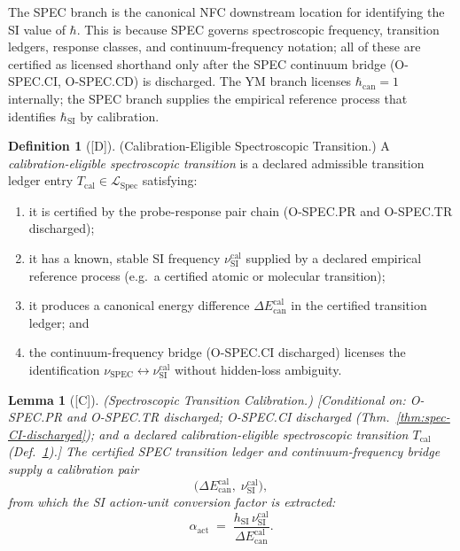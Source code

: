 \documentclass[12pt,oneside]{amsbook}
\theoremstyle{plain}
\newtheorem{lemma}[theorem]{Lemma}
\theoremstyle{definition}
\newtheorem{definition}[theorem]{Definition}
\theoremstyle{remark}
\newcommand{\status}[1]{\textup{[#1]}}
\begin{document}
The SPEC branch is the canonical NFC downstream location for
identifying the SI value of $\hbar$. This is because SPEC governs
spectroscopic frequency, transition ledgers, response classes, and
continuum-frequency notation; all of these are certified as licensed
shorthand only after the SPEC continuum bridge (O-SPEC.CI, O-SPEC.CD)
is discharged. The YM branch licenses $\hbar_{\mathrm{can}}=1$
internally; the SPEC branch supplies the empirical reference process
that identifies $\hbar_{\mathrm{SI}}$ by calibration.

\begin{definition}[\status{D}]\label{def:spec-calibration-transition}
\textup{(Calibration-Eligible Spectroscopic Transition.)}
A \emph{calibration-eligible spectroscopic transition} is a declared
admissible transition ledger entry
$T_{\mathrm{cal}} \in \mathcal{L}_{\mathrm{Spec}}$
satisfying:
\begin{enumerate}[label=\textup{(\arabic*)}]
 \item it is certified by the probe-response pair chain
 (O-SPEC.PR and O-SPEC.TR discharged);
 \item it has a known, stable SI frequency
 $\nu_{\mathrm{SI}}^{\mathrm{cal}}$
 supplied by a declared empirical reference process (e.g.\ a
 certified atomic or molecular transition);
 \item it produces a canonical energy difference
 $\Delta E_{\mathrm{can}}^{\mathrm{cal}}$
 in the certified transition ledger; and
 \item the continuum-frequency bridge (O-SPEC.CI discharged) licenses
 the identification
 $\nu_{\mathrm{SPEC}} \leftrightarrow \nu_{\mathrm{SI}}^{\mathrm{cal}}$
 without hidden-loss ambiguity.
\end{enumerate}
\end{definition}

\begin{lemma}[\status{C}]\label{lem:SPEC-transition-calibration}
\textup{(Spectroscopic Transition Calibration.)}
\textup{[Conditional on: O-SPEC.PR and O-SPEC.TR discharged;
O-SPEC.CI discharged (Thm.~\ref{thm:spec-CI-discharged}); and a
declared calibration-eligible spectroscopic transition
$T_{\mathrm{cal}}$ (Def.~\ref{def:spec-calibration-transition}).]}
The certified SPEC transition ledger and continuum-frequency bridge
supply a calibration pair
\[
 \bigl(\Delta E_{\mathrm{can}}^{\mathrm{cal}},\;
 \nu_{\mathrm{SI}}^{\mathrm{cal}}\bigr),
\]
from which the SI action-unit conversion factor is extracted:
\[
 \alpha_{\mathrm{act}} \;=\;
 \frac{h_{\mathrm{SI}}\,\nu_{\mathrm{SI}}^{\mathrm{cal}}}
 {\Delta E_{\mathrm{can}}^{\mathrm{cal}}}.
\]
\end{lemma}
\end{document}
